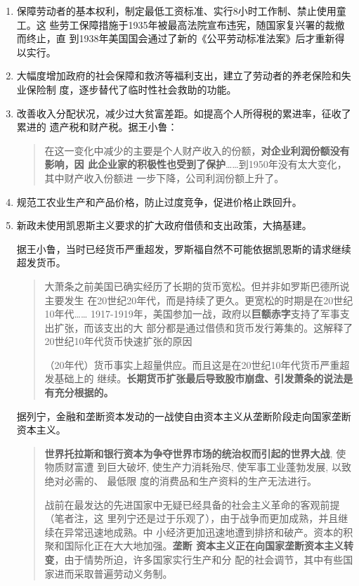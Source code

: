 \begin{enumerate}
\item 保障劳动者的基本权利，制定最低工资标准、实行8小时工作制、禁止使用童工。这
  些劳工保障措施于1935年被最高法院宣布违宪，随国家复兴署的裁撤而终止，直
  到1938年美国国会通过了新的《公平劳动标准法案》后才重新得以实行。

\item 大幅度增加政府的社会保障和救济等福利支出，建立了劳动者的养老保险和失业保险制
度，逐步替代了临时性社会救助的功能。

\item 改善收入分配状况，减少过大贫富差距。如提高个人所得税的累进率，征收了累进的
  遗产税和财产税。据王小鲁：
  \begin{quotation}
    在这一变化中减少的主要是个人财产收入的份额，\textbf{对企业利润份额没有影响，因
    此企业家的积极性也受到了保护}……到1950年没有太大变化，其中财产收入份额进
    一步下降，公司利润份额上升了。
\end{quotation}

\item 规范工农业生产和产品价格，防止过度竞争，促进价格止跌回升。

\item 新政未使用凯恩斯主义要求的扩大政府借债和支出政策，大搞基建。

  据王小鲁，当时已经货币严重超发，罗斯福自然不可能依据凯恩斯的请求继续超发货币。
  \begin{quotation}
    大萧条之前美国已确实经历了长期的货币宽松。但并非如罗斯巴德所说主要发生
    在20世纪20年代，而是持续了更久。更宽松的时期是在20世纪10年代……
    1917-1919年，美国参加一战，政府以\textbf{巨额赤字}支持了军事支出扩张，而该支出的大
    部分都是通过借债和货币发行筹集的。这解释了20世纪10年代货币快速扩张的原因

    （20年代）货币事实上超量供应。而且这是在20世纪10年代货币严重超发基础上的
    继续。\textbf{长期货币扩张最后导致股市崩盘、引发萧条的说法是有充分根据的。}
  \end{quotation}

  据列宁，金融和垄断资本发动的一战使自由资本主义从垄断阶段走向国家垄断资本主义。
  \begin{quotation}
    \textbf{世界托拉斯和银行资本为争夺世界市场的统治权而引起的世界大战}, 使物质财富遭
    到巨大破坏, 使生产力消耗殆尽, 使军事工业蓬勃发展, 以致绝对必需的、 最低限
    度的消费品和生产资料的生产无法进行。

    战前在最发达的先进国家中无疑已经具备的社会主义革命的客观前提（笔者注，这
    里列宁还是过于乐观了），由于战争而更加成熟，并且继续在异常迅速地成熟。中
    小经济更加迅速地遭到排挤和破产。资本的积聚和国际化正在大大地加强。\textbf{垄断
      资本主义正在向国家垄断资本主义转变}，由于情势所迫，许多国家实行生产和分
    配的社会调节，其中有些国家进而采取普遍劳动义务制。
  \end{quotation}


\end{enumerate}
